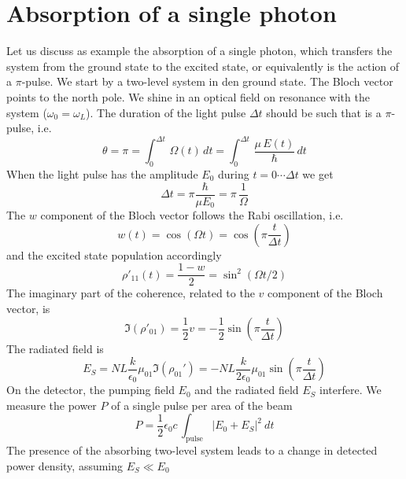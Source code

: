 \section{Absorption of a single photon}

Let us discuss as example the absorption of a single photon, which transfers the system from the ground state to the excited state, or equivalently is the action of a $\pi$-pulse. We start by a two-level system in den ground state. The Bloch vector points to the north pole. We shine in an optical field on resonance with the system ($\omega_0 = \omega_L$). The duration of the light pulse $\Delta t$ should be such that is a $\pi$-pulse, i.e.
\begin{equation}
 \theta = \pi = \int_0^{\Delta t} \, \Omega(t) \, dt =  \int_0^{\Delta t} \, \frac{ \mu \, E(t)}{\hbar} \, dt
\end{equation}
When the light pulse has the amplitude $E_0$ during $t= 0 \cdots \Delta t$ we get
\begin{equation}
 \Delta t = \pi \frac{\hbar}{\mu E_0}  = \pi \, \frac{1}{\Omega}
\end{equation} 
The $w$ component of the Bloch vector follows the Rabi oscillation, i.e.
\begin{equation}
 w(t) = \cos ( \Omega t  ) = \cos \left( \pi  \frac{t}{\Delta t} \right)
\end{equation}
and the excited state population accordingly
\begin{equation}
 \rho'_{11}(t) = \frac{1 - w}{2}  = \sin^2 ( \Omega t /2 )
\end{equation}
The imaginary part of the coherence, related to the $v$ component of the Bloch vector, is
\begin{equation}
 \Im (\rho'_{01} ) = \frac{1}{2} v =  - \frac{1}{2}  \sin \left( \pi \frac{t}{\Delta t} \right)
\end{equation}
The radiated field is 
\begin{equation}
 E_S  = N L \frac{k }{\epsilon_0}  \mu_{01} \Im (\rho_{01}' ) 
 = - N L \frac{k }{2 \epsilon_0}  \mu_{01} \sin \left( \pi \frac{t}{\Delta t} \right)
\end{equation}
On the detector, the pumping field $E_0$ and the radiated field $E_S$ interfere. We measure the power $P$ of a single pulse per area of the beam  
\begin{equation}
P  = \frac{1}{2} \epsilon_0 c \, \int_\text{pulse} | E_0 + E_S |^2 \ dt
\end{equation}
The presence of the absorbing two-level system leads to a change in detected power density, assuming $E_S \ll E_0$
